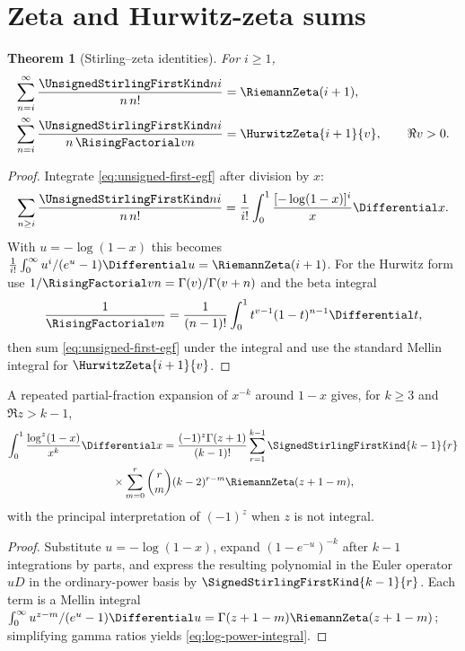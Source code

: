 \documentclass[11pt,a4paper,oneside,openany]{book}
\newtheorem{theorem}{Theorem}[chapter]
\theoremstyle{definition}
\theoremstyle{remark}
\begin{document}
\section{Zeta and Hurwitz-zeta sums}
\begin{theorem}[Stirling--zeta identities]\label{thm:stirling-zeta}
For $i\ge1$,
\begin{align}
 \sum_{n=i}^\infty\frac{\UnsignedStirlingFirstKind ni}{n\,n!}&=\RiemannZeta(i+1),
 \label{eq:first-zeta}\\
 \sum_{n=i}^\infty\frac{\UnsignedStirlingFirstKind ni}{n\,\RisingFactorial v n}&=\HurwitzZeta{i+1}{v},
 \qquad \Re v>0.\label{eq:first-hurwitz}
\end{align}
\end{theorem}
\begin{proof}
Integrate \cref{eq:unsigned-first-egf} after division by $x$:
\[
 \sum_{n\ge i}\frac{\UnsignedStirlingFirstKind ni}{n\,n!}
 =\frac1{i!}\int_0^1\frac{[-\log(1-x)]^i}{x}\Differential x.
\]
With $u=-\log(1-x)$ this becomes
$\frac1{i!}\int_0^\infty u^i/(e^u-1)\Differential u=\RiemannZeta(i+1)$.
For the Hurwitz form use
$1/\RisingFactorial v n=\Gamma(v)/\Gamma(v+n)$ and the beta integral
\[
 \frac1{\RisingFactorial v n}=\frac1{(n-1)!}\int_0^1t^{v-1}(1-t)^{n-1}\Differential t,
\]
then sum \cref{eq:unsigned-first-egf} under the integral and use the standard
Mellin integral for $\HurwitzZeta{i+1}{v}$.
\end{proof}

A repeated partial-fraction expansion of $x^{-k}$ around $1-x$ gives, for
$k\ge3$ and $\Re z>k-1$,
\begin{multline}\label{eq:log-power-integral}
 \int_0^1\frac{\log^z(1-x)}{x^k}\Differential x
 =\frac{(-1)^z\Gamma(z+1)}{(k-1)!}
 \sum_{r=1}^{k-1}\SignedStirlingFirstKind{k-1}{r}\\
 {}\times\sum_{m=0}^r\binom rm(k-2)^{r-m}\RiemannZeta(z+1-m),
\end{multline}
with the principal interpretation of $(-1)^z$ when $z$ is not integral.
\begin{proof}
Substitute $u=-\log(1-x)$, expand
$(1-e^{-u})^{-k}$ after $k-1$ integrations by parts, and express the resulting
polynomial in the Euler operator $uD$ in the ordinary-power basis by
$\SignedStirlingFirstKind{k-1}{r}$.  Each term is a Mellin integral
$\int_0^\infty u^{z-m}/(e^u-1)\Differential u=\Gamma(z+1-m)\RiemannZeta(z+1-m)$; simplifying gamma
ratios yields \cref{eq:log-power-integral}.
\end{proof}
\end{document}
